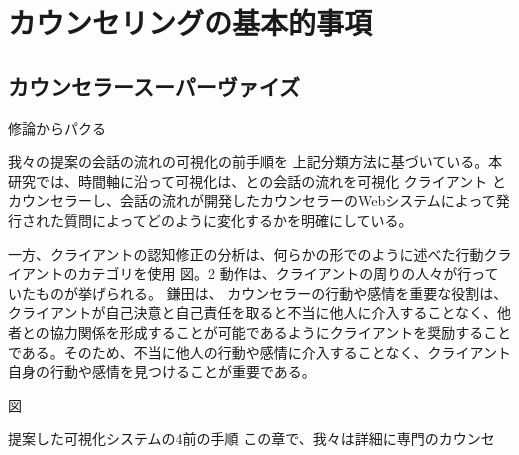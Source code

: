 \documentclass[shuuron]{kuee}
\begin{document}
\section{カウンセリングの基本的事項}
\subsection{カウンセラースーパーヴァイズ}

修論からパクる


我々の提案の会話の流れの可視化の前手順を 上記分類方法に基づいている。本研究では、時間軸に沿って可視化は、との会話の流れを可視化 クライアント とカウンセラーし、会話の流れが開発したカウンセラーのWebシステムによって発行された質問によってどのように変化するかを明確にしている。

一方、クライアントの認知修正の分析は、何らかの形でのように述べた行動クライアントのカテゴリを使用 図。2 動作は、クライアントの周りの人々が行っていたものが挙げられる。 鎌田\cite{kamata2002}は、 カウンセラーの行動や感情を重要な役割は、クライアントが自己決意と自己責任を取ると不当に他人に介入することなく、他者との協力関係を形成することが可能であるようにクライアントを奨励することである。そのため、不当に他人の行動や感情に介入することなく、クライアント自身の行動や感情を見つけることが重要である。

図

提案した可視化システムの4前の手順
 この章で、我々は詳細に専門のカウンセ
\end{document}
